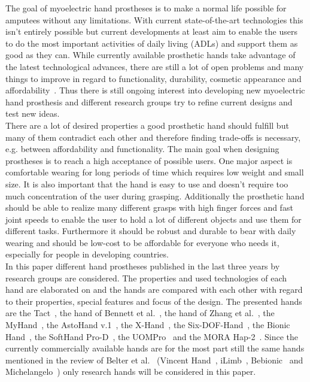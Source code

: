 \documentclass[a4paper, 10pt, conference]{ieeeconf}      %
\begin{document}
The goal of myoelectric hand prostheses is to make a normal life possible for amputees without any limitations. With current state-of-the-art technologies this isn't entirely possible but current developments at least aim to enable the users to do the most important activities of daily living (ADLs) and support them as good as they can. While currently available prosthetic hands take advantage of the latest technological advances, there are still a lot of open problems and many things to improve in regard to functionality, durability, cosmetic appearance and affordability~\cite{review}. Thus there is still ongoing interest into developing new myoelectric hand prosthesis and different research groups try to refine current designs and test new ideas.\\
There are a lot of desired properties a good prosthetic hand should fulfill but many of them contradict each other and therefore finding trade-offs is necessary, e.g. between affordability and functionality. The main goal when designing prostheses is to reach a high acceptance of possible users. One major aspect is comfortable wearing for long periods of time which requires low weight and small size. It is also important that the hand is easy to use and doesn't require too much concentration of the user during grasping. Additionally the prosthetic hand should be able to realize many different grasps with high finger forces and fast joint speeds to enable the user to hold a lot of different objects and use them for different tasks. Furthermore it should be robust and durable to bear with daily wearing and should be low-cost to be affordable for everyone who needs it, especially for people in developing countries.\\
In this paper different hand prostheses published in the last three years by research groups are considered. The properties and used technologies of each hand are elaborated on and the hands are compared with each other with regard to their properties, special features and focus of the design. The presented hands are the Tact~\cite{tact}, the hand of Bennett et al.~\cite{bennett}, the hand of Zhang et al.~\cite{zhang}, the MyHand~\cite{myhand}, the AstoHand v.1~\cite{astohand}, the X-Hand~\cite{xhand}, the Six-DOF-Hand~\cite{6dofhand}, the Bionic Hand~\cite{bionichand}, the SoftHand Pro-D~\cite{softhand}, the UOMPro~\cite{uompro} and the MORA Hap-2~\cite{morahap2}. Since the currently commercially available hands are for the most part still the same hands mentioned in the review of Belter et al.~\cite{review} (Vincent Hand~\cite{vincent}, iLimb~\cite{ilimb}, Bebionic~\cite{bebionic} and Michelangelo~\cite{michelangelo}) only research hands will be considered in this paper.
 
\end{document}
